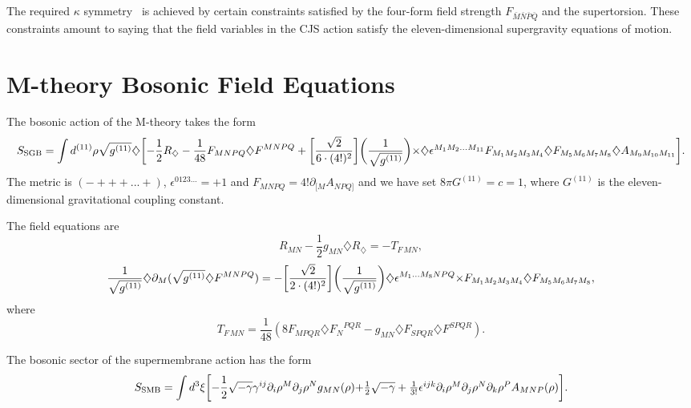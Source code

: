 \documentclass[a4paper,12pt]{article}
\begin{document}
The required $\kappa$ symmetry~\cite{Townsend,Duff} is achieved
by certain constraints satisfied by the four-form field strength
$F_{{\bar M}{\bar N}{\bar P}{\bar Q}}$ and the supertorsion.
These constraints amount to saying that the field variables in
the CJS action satisfy the eleven-dimensional supergravity
equations of motion.

\section{\bf M-theory Bosonic Field Equations}

The bosonic action of the M-theory takes the form
\begin{equation}
S_{\rm SGB}=\int
d^{(11)}\rho\sqrt{g^{(11)}}\diamondsuit\biggl[-\frac{1}{2}R_{\diamondsuit}
-\frac{1}{48}F_{MNPQ}\diamondsuit
F^{MNPQ}+\biggl[\frac{\sqrt{2}}{6\cdot(4!)^2}\biggr]\biggl(\frac{1}{\sqrt{g^{(11)}}}\biggr)
$$ $$ \times\diamondsuit
\epsilon^{M_1M_2...M_{11}}F_{M_1M_2M_3M_4}\diamondsuit
F_{M_5M_6M_7M_8}\diamondsuit A_{M_9M_{10}M_{11}}\biggr].
\end{equation}
The metric is $(-+++...+)$, $\epsilon^{0123...}=+1$ and
$F_{MNPQ}=4!\partial_{[M}A_{NPQ]}$ and we have set $8\pi G^{(11)}=c=1$,
where $G^{(11)}$ is the eleven-dimensional gravitational coupling constant.

The field equations are
\begin{equation}
R_{MN}-\frac{1}{2}g_{MN}\diamondsuit R_{\diamondsuit}=-T_{F\,MN},
\end{equation}
\begin{equation}
\label{Fequation}
\frac{1}{\sqrt{g^{(11)}}}\diamondsuit\partial_M(\sqrt{g^{(11)}}\diamondsuit
F^{MNPQ})
=-\biggl[\frac{\sqrt{2}}{2\cdot(4!)^2}\biggr]\biggl(\frac{1}{\sqrt{g^{(11)}}}\biggr)
\diamondsuit\epsilon^{M_1...M_8NPQ}
$$ $$ \times
F_{M_1M_2M_3M_4}\diamondsuit
F_{M_5M_6M_7M_8},
\end{equation}
where
\begin{equation}
\label{Ftensor}
T_{F\,MN}=\frac{1}{48}(8F_{MPQR}\diamondsuit {F_N}^{PQR}-g_{MN}\diamondsuit
F_{SPQR}\diamondsuit F^{SPQR}).
\end{equation}

The bosonic sector of the supermembrane action has
the form
\begin{equation}
\label{bosesmaction}
S_{\rm SMB}=\int d^{3}\xi
\biggl[-\frac{1}{2}\sqrt{-\gamma}\gamma^{ij}\partial_i \rho^M\partial_j
\rho^Ng_{MN}(\rho)
$$ $$
+\frac{1}{2}\sqrt{-\gamma}
+\frac{1}{3!}\epsilon^{ijk}\partial_i\rho^M\partial_j
\rho^N\partial_k\rho^PA_{MNP}(\rho)\biggr].
\end{equation}
\end{document}
